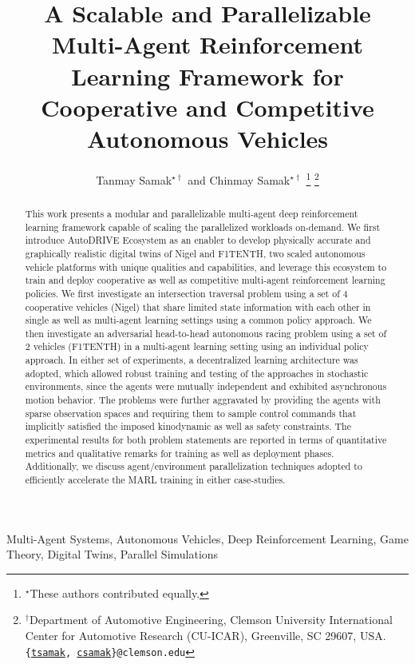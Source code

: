 \documentclass[letterpaper, 10 pt, conference]{ieeeconf}  %
\title{\LARGE \bf
A Scalable and Parallelizable Multi-Agent Reinforcement Learning Framework for Cooperative and Competitive Autonomous Vehicles
}
\author{Tanmay Samak$^{\star \dagger}$ and Chinmay Samak$^{\star \dagger}$%
\thanks{$^{\star}$These authors contributed equally.}%
\thanks{$^{\dagger}$Department of Automotive Engineering, Clemson University International Center for Automotive Research (CU-ICAR), Greenville, SC 29607, USA.
{\tt\small {\{\href{mailto:tsamak@clemson.edu}{tsamak}, \href{mailto:csamak@clemson.edu}{csamak}\}@clemson.edu}}}%
}
\begin{document}
\maketitle
\thispagestyle{empty}
\pagestyle{empty}


\begin{abstract}
This work presents a modular and parallelizable multi-agent deep reinforcement learning framework capable of scaling the parallelized workloads on-demand. We first introduce AutoDRIVE Ecosystem as an enabler to develop physically accurate and graphically realistic digital twins of Nigel and F1TENTH, two scaled autonomous vehicle platforms with unique qualities and capabilities, and leverage this ecosystem to train and deploy cooperative as well as competitive multi-agent reinforcement learning policies. We first investigate an intersection traversal problem using a set of 4 cooperative vehicles (Nigel) that share limited state information with each other in single as well as multi-agent learning settings using a common policy approach. We then investigate an adversarial head-to-head autonomous racing problem using a set of 2 vehicles (F1TENTH) in a multi-agent learning setting using an individual policy approach. In either set of experiments, a decentralized learning architecture was adopted, which allowed robust training and testing of the approaches in stochastic environments, since the agents were mutually independent and exhibited asynchronous motion behavior. The problems were further aggravated by providing the agents with sparse observation spaces and requiring them to sample control commands that implicitly satisfied the imposed kinodynamic as well as safety constraints. The experimental results for both problem statements are reported in terms of quantitative metrics and qualitative remarks for training as well as deployment phases. Additionally, we discuss agent/environment parallelization techniques adopted to efficiently accelerate the MARL training in either case-studies.\\%
\end{abstract}

\begin{keywords}
Multi-Agent Systems, Autonomous Vehicles, Deep Reinforcement Learning, Game Theory, Digital Twins, Parallel Simulations\\%
\end{keywords}
\end{document}
